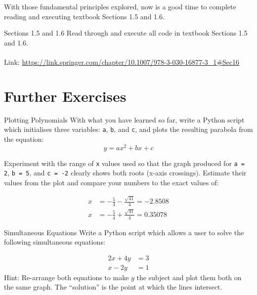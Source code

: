 \documentclass{lab}
\begin{document}
With those fundamental principles explored, now is a good time to complete reading and executing textbook Sections 1.5 and 1.6.

\begin{task}{Sections 1.5 and 1.6}{}
Read through and execute all code in textbook Sections 1.5 and 1.6.
\\~\\
Link: \url{https://link.springer.com/chapter/10.1007/978-3-030-16877-3_1#Sec16}
\end{task}

\pagebreak
\section{Further Exercises}

\begin{task}{Plotting Polynomials}{}
With what you have learned so far, write a Python script which initialises three variables: \texttt{a}, \texttt{b}, and \texttt{c}, and plots the resulting parabola from the equation:
\begin{equation}
y = ax^2 + bx + c
\end{equation}

Experiment with the range of \texttt{x} values used so that the graph produced for \texttt{a = 2}, \texttt{b = 5}, and \texttt{c = -2} clearly shows both roots (x-axis crossings). Estimate their values from the plot and compare your numbers to the exact values of:

\begin{align*}
x &= - \frac{5}{4} - \frac{\sqrt{41}}{4} = -2.8508\\
x &= - \frac{5}{4} + \frac{\sqrt{41}}{4} = 0.35078
\end{align*}
\end{task}

\begin{task}{Simultaneous Equations}{}
Write a Python script which allows a user to solve the following simultaneous equations:

\begin{align}
2x + 4y &= 3\\
x - 2y &= 1
\end{align}
Hint: Re-arrange both equations to make $y$ the subject and plot them both on the same graph. The ``solution'' is the point at which the lines intersect.
\end{task}
\end{document}
